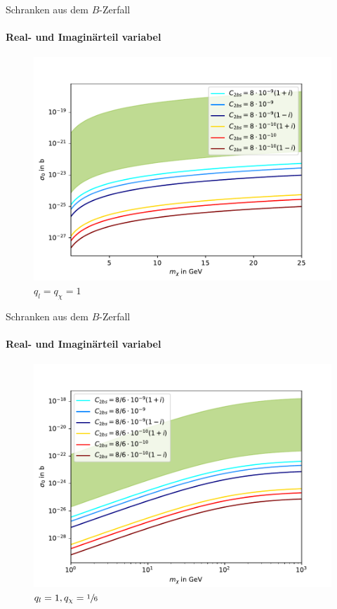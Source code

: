 \begin{frame}{Schranken aus dem $B$-Zerfall}
\framesubtitle{Real- und Imaginärteil variabel}
	\begin{figure}
		\centering
		\includegraphics[width=.8\textwidth]{Bilder/Allgemein11.pdf}
		\caption{$q_l=q_\chi=1$}
	\end{figure}
\end{frame}
\begin{frame}[noframenumbering]{Schranken aus dem $B$-Zerfall}
\framesubtitle{Real- und Imaginärteil variabel}
	\begin{figure}
		\centering
		\includegraphics[width=.8\textwidth]{Bilder/Allgemein116.pdf}
		\caption{$q_l=1,q_\chi=\sfrac{1}{6}$}
	\end{figure}
\end{frame}


